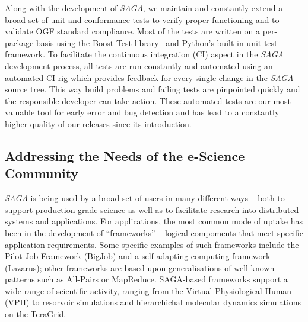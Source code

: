\documentclass[a4paper,10pt]{article}
\newcommand{\sagaimpl}{\textit{SAGA}\xspace}
\newcommand{\impl}{\sagaimpl}
\newcommand{\note}[1]{ {\textcolor{red} { ***NOTE: #1 }}}
\newcommand{\jhanote}[1]{  {\textcolor{red}     { ***Shantenu: #1 }}}
\newcommand{\jhanote}[1]{}
\begin{document}
 Along with the development of \impl, we maintain and constantly
 extend a broad set of unit and conformance tests to verify proper
 functioning and to validate OGF standard compliance. Most of the
 tests are written on a per-package basis using the Boost Test
 library~\cite{boost_test_web} and Python's built-in unit test
 framework. To facilitate the continuous integration (CI) aspect in
 the \impl development process, all tests are run constantly and
 automated using an automated CI rig\cite{buildbot_web} which provides
 feedback for every single change in the \impl source tree. This way
 build problems and failing tests are pinpointed quickly and the
 responsible developer can take action. These automated tests are  our
 most valuable tool for early error and bug detection and has lead to
 a constantly higher quality of our releases since its introduction.

\vspace{-0.8em}

\subsection*{Addressing the Needs of the e-Science Community}
\vspace{-0.6em}

 \impl is being used by a broad set of users in many different ways -- both to
 support production-grade science as well as to facilitate research into
 distributed systems and applications.  For applications, the most common mode
 of uptake has been in the development of ``frameworks'' -- logical compoments
 that meet specific application requirements. Some specific examples of such
 frameworks include the Pilot-Job Framework (BigJob) and a self-adapting
 computing framework (Lazarus); other frameworks are based upon generalisations
 of well known patterns such as All-Pairs or MapReduce.  SAGA-based frameworks
 support a wide-range of scientific activity, ranging from the Virtual
 Physiological Human (VPH) to resorvoir simulations and hierarchichal molecular
 dynamics simulations on the TeraGrid.
\end{document}
